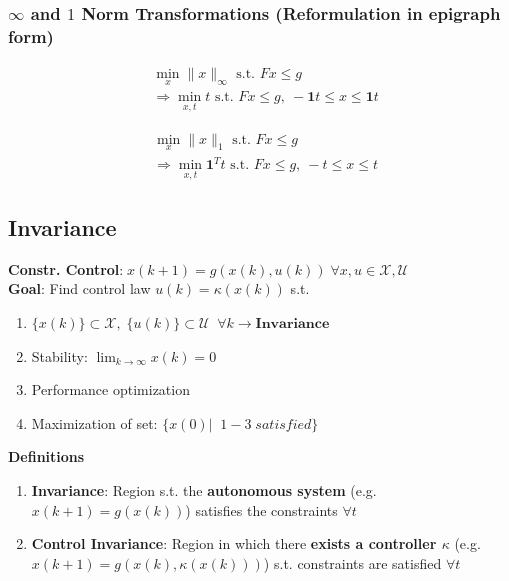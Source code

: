 \subsubsection{$\infty$ and $1$ Norm Transformations (Reformulation in \textbf{epigraph} form)}
\noindent
\begin{minipage}[t]{0.48\linewidth}
\small
\begin{align*}
&\min_{x} \|x\|_\infty \text{ s.t. } Fx \leq g \\
&\Rightarrow \min_{x,t} t \text{ s.t. } Fx \leq g,\ -\mathbf{1}t \leq x \leq \mathbf{1}t
\end{align*}
\end{minipage}%
\hfill
\begin{minipage}[t]{0.48\linewidth}
\small
\begin{align*}
&\min_{x} \|x\|_1 \text{ s.t. } Fx \leq g \\
&\Rightarrow \min_{x,t} \mathbf{1}^T t \text{ s.t. } Fx \leq g,\ -t \leq x \leq t
\end{align*}
\end{minipage}


\subsection{Invariance}
\textbf{Constr. Control}:$\;x(k+1)=g(x(k),u(k))\;\forall x,u\in \mathcal{X},\mathcal{U}$\\
\textbf{Goal}: Find control law $u(k)=\kappa(x(k))$ s.t.
\begin{enumerate}
    \item $\{x(k)\}\subset\mathcal{X},\;\{u(k)\}\subset\mathcal{U}\;\;\forall k \rightarrow\textbf{Invariance}$
    \item Stability: $\lim_{k\rightarrow\infty}x(k)=0$
    \item Performance optimization
    \item Maximization of set: $\{x(0)|\;\;1-3\; satisfied\}$
\end{enumerate}
\textbf{Definitions}
\begin{enumerate}
    \item \textbf{Invariance}: Region s.t. the \textbf{autonomous system} (e.g. $x(k+1)=g(x(k))$) satisfies the constraints $\forall t$
    \item \textbf{Control Invariance}: Region in which there \textbf{exists a controller $\kappa$} (e.g. $x(k+1)=g(x(k),\kappa(x(k)))$) s.t. constraints are satisfied $\forall t$
\end{enumerate}


